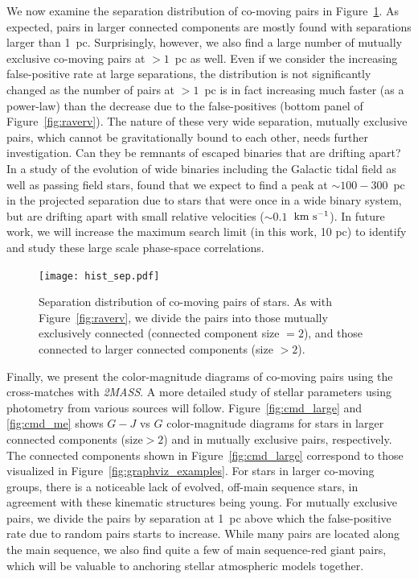 \documentclass[manuscript, letterpaper]{aastex6}
\newcommand{\project}[1]{\textsl{#1}}
\newcommand{\acronym}[1]{{\small{#1}}}
\newcommand{\tmass}{\project{\acronym{2MASS}}}
\newcommand{\kms}{\ensuremath{\rm km~s^{-1}}}
\begin{document}
We now examine the separation distribution of co-moving pairs in
Figure~\ref{fig:hist_separation}.
As expected, pairs in larger connected components are mostly
found with separations larger than 1~pc.
Surprisingly, however, we also find a large number of mutually exclusive co-moving
pairs
at $>1$~pc as well. Even if we consider the increasing false-positive rate at large
separations, the distribution is not significantly changed as the number of pairs
at $>1$~pc is in fact increasing much faster (as a power-law)
than the decrease due to the false-positives
(bottom panel of Figure~\ref{fig:raverv}).
The nature of these very wide separation, mutually exclusive pairs,
which cannot be gravitationally bound to each other, needs further investigation.
Can they be remnants of escaped binaries that are drifting apart?
In a study of the evolution of wide binaries including the Galactic tidal field
as well as passing field stars, \citet{Jiang:2010aa} found that we expect
to find a peak at $\sim 100-300$~pc in the projected separation due to
stars that were once in a wide binary system, but are drifting apart with small
relative velocities ($\sim 0.1$~\kms).
In future work, we will increase the maximum search limit (in this work, 10 pc)
to identify and study these large scale phase-space correlations.

\begin{figure}[htbp]
  \begin{center}
    \texttt{[image: hist\_sep.pdf]}
  \end{center}
  \caption{%
    Separation distribution of co-moving pairs of stars.
    As with Figure~\ref{fig:raverv},
    we divide the pairs into those mutually exclusively connected
    (connected component size $=2$), and those connected to larger connected components (size $>2$).
    \label{fig:hist_separation}
    }
\end{figure}

Finally, we present the color-magnitude diagrams of co-moving pairs
using the cross-matches with \tmass.
A more detailed study of stellar parameters using photometry from various sources
will follow. Figure~\ref{fig:cmd_large} and \ref{fig:cmd_me} shows $G-J$ vs $G$
color-magnitude diagrams for stars in larger connected components (size$>2$)
and in mutually exclusive pairs, respectively.
The connected components shown in Figure~\ref{fig:cmd_large}
correspond to those visualized
in Figure~\ref{fig:graphviz_examples}.
For stars in larger co-moving groups, there is a noticeable
lack of evolved, off-main sequence
stars, in agreement with these kinematic structures being young.
For mutually exclusive pairs, we divide the pairs by separation at 1~pc
above which the false-positive rate due to random pairs starts to increase.
While many pairs are located along the main sequence, we also find
quite a few of main sequence-red giant pairs,
which will be valuable to anchoring stellar atmospheric models together.
\end{document}
